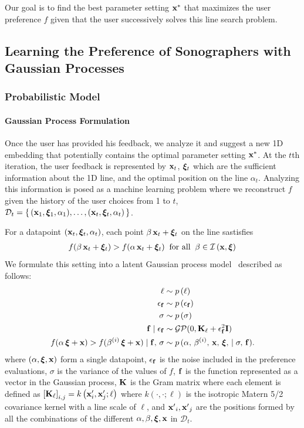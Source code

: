 Our goal is to find the best parameter setting \(\mathbf{x}^{*}\) that maximizes the user preference \(f\) given that the user successively solves this line search problem.

\subsection{Learning the Preference of Sonographers with Gaussian Processes}\label{section:gp}
\subsubsection{Probabilistic Model}
\paragraph{Gaussian Process Formulation}
Once the user has provided his feedback, we analyze it and suggest a new 1D embedding that potentially contains the optimal parameter setting \(\mathbf{x}^{*}\).
At the \(t\)th iteration, the user feedback is represented by \(\mathbf{x}_t\), \(\bm{\xi}_t\) which are the sufficient information about the 1D line, and the optimal position on the line \(\alpha_t\).
Analyzing this information is posed as a machine learning problem where we reconstruct \(f\) given the history of the user choices from 1 to \(t\), \(\mathcal{D}_t = \{\,(\mathbf{x}_1, \bm{\xi}_1, \alpha_1), \ldots, (\mathbf{x}_t, \bm{\xi}_t, \alpha_t)\,\}\).

For a datapoint \( (\mathbf{x}_t, \bm{\xi}_t, \alpha_t) \), each point \(\beta\,\mathbf{x}_t + \bm{\xi}_t\) on the line sastisfies
\begin{align}
f(\beta\,\mathbf{x}_t + \bm{\xi}_t ) > f(\alpha\,\mathbf{x}_t + \bm{\xi}_t) \;\;\text{for all}\;\; \beta \in \mathcal{I}\left(\mathbf{x}, \bm{\xi}\right)\nonumber
\end{align}
We formulate this setting into a latent Gaussian process model~\cite{rasmussen_gaussian_2006} described as follows:
\begin{align}
\ell                    &\sim p\,(\ell) \nonumber\\
\epsilon_{\mathbf{f}}           &\sim p\,(\epsilon_{\mathbf{f}}) \nonumber\\
\sigma                  &\sim p\,(\sigma) \nonumber\\
\mathbf{f} \mid \epsilon_{\mathbf{f}}  &\sim \mathcal{GP}(0, \mathbf{K}_{\ell} + \epsilon_{\mathbf{f}}^2\mathbf{I}) \nonumber\\
  f(\alpha\,\bm{\xi} + \mathbf{x}) > f(\beta^{(i)} \,\bm{\xi} + \mathbf{x}) \mid \mathbf{f},\, \sigma
  &\sim p\,(\alpha,\, \beta^{(i)},\, \mathbf{x},\,\bm{\xi},\, \mid \sigma,\, \mathbf{f}).\nonumber 
\end{align}
%
{\noindent}where \((\alpha, \bm{\xi}, \mathbf{x})\) form a single datapoint, \(\epsilon_{\mathbf{f}}\) is the noise included in the preference evaluations, \(\sigma\) is the variance of the values of \(f\), \(\mathbf{f}\) is the function represented as a vector in the Gaussian process, \(\mathcal{\mathbf{K}}\) is the Gram matrix where each element is defined as
\(
  {[\mathbf{K}_{\ell}]}_{i,j} = k\left(\mathbf{x}^\prime_i, \mathbf{x}^\prime_j; \ell \right)
\)
where \(k\left(\cdot, \cdot; \ell \right)\) is the isotropic Matern 5/2 covariance kernel with a line scale of \(\ell\), and \({\mathbf{x}^\prime}_i, {\mathbf{x}^\prime}_j\) are the positions formed by all the combinations of the different \(\alpha, \beta, \bm{\xi}, \mathbf{x}\) in \(\mathcal{D}_t\).


